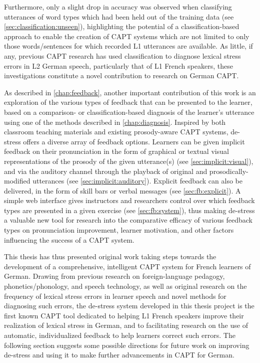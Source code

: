 	Furthermore, 
	only a slight drop in accuracy was observed when classifying utterances of word types which had been held out of the training data
	(see \cref{sec:classification:unseen}), highlighting the potential of a classification-based approach to enable the creation of CAPT systems which are not limited to only those words/sentences for which recorded L1 utterances are available.
	As little, if any, previous CAPT research has used classification to diagnose lexical stress errors in L2 German speech, particularly that of L1 French speakers, these investigations constitute 
	a novel contribution
	to research on German CAPT.




%
As described in \cref{chap:feedback}, another important contribution of this work is an exploration of the various types of feedback that can be presented to the learner, based on a comparison- or classification-based diagnosis of the learner's utterance using one of the methods described in \cref{chap:diagnosis}. 
	Inspired by both classroom teaching materials and existing prosody-aware CAPT systems, de-stress offers a diverse array of feedback options. Learners can be given implicit feedback on their pronunciation in the form of graphical or textual visual representations of the prosody of the given utterance(s) (see \cref{sec:implicit:visual}), and via the auditory channel through the playback of original and prosodically-modified utterances (see \cref{sec:implicit:auditory}).
	Explicit feedback can also be delivered, in the form of skill bars %
	or verbal messages %
	(see \cref{sec:fb:explicit}).
	A simple web interface gives  instructors and researchers control over which feedback types are presented in a given exercise (see \cref{sec:fb:system}), thus making de-stress a valuable new tool for research into the comparative efficacy of various feedback types on pronunciation improvement, learner motivation, and other factors influencing the success of a CAPT system. 



%
This thesis has thus presented original work taking steps towards the development of a comprehensive, intelligent CAPT system for French learners of German. Drawing from previous research on foreign-language pedagogy, phonetics/phonology, and speech technology, as well as original research on the frequency of lexical stress errors in learner speech and novel methods for diagnosing such errors, the de-stress system developed in this thesis project is the first known CAPT tool dedicated to helping L1 French speakers improve their realization of lexical stress in German, and to facilitating research on the use of automatic, individualized feedback to help learners correct such errors. The following section suggests some possible directions for future work on improving de-stress and using it to make further advancements in CAPT for German.


